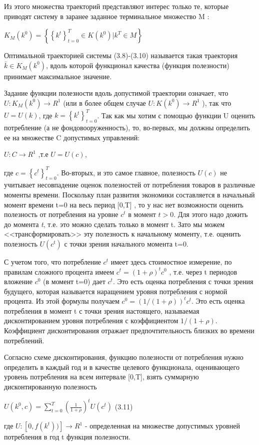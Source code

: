 \documentclass[12pt, 4paper]{book}
\begin{document}
{Из этого множества траекторий представляют интерес только те, которые приводят систему в заранее заданное терминальное множество M :
\begin{center}
$K_M(k^0)=\left\{\left\{k^t\right\}_{t=0}^T \in K(k^0)|k^T \in M\right\}$
\end{center}
\par

Оптимальной траекторией системы (3.8)-(3.10) называется такая траектория $\bar{k} \in K_M(k^0)$, вдоль которой функционал качества (функция полезности) принимает максимальное значение.
\par

Задание функции полезности вдоль допустимой траектории означает, что $U:K_M(k^0) \rightarrow R^1$ (или в более общем случае $U:K(k^0) \rightarrow R^1$ ), так что $U=U(k)$, где $k=\left\{k^t\right\}_{t=0}^T$. Так как мы хотим с помощью функции U оценить потребление (а не фондовооруженность), то, во-первых, мы должны определить ее на множестве C допустимых управлений:
\begin{center}
$U:C \rightarrow R^1$ ,т.е $U=U(c)$,
\end{center}
где  $c=\left\{c^t\right\}_{t=0}^T$. Во-вторых, и это самое главное, полезность $U(c)$ не учитывает несовпадение оценок полезностей от потребления товаров в различные моменты времени. Поскольку план развития экономики составляется в начальный момент времени t=0 на весь период [0,T] , то у нас нет возможности оценить полезность от потребления на уровне $c^t$ в момент $t>0$. Для этого надо дожить до момента \textit{t}, т.е. это можно сделать только в момент t. Зато мы можем <<трансформировать>> эту полезность к начальному моменту, т.е. оценить полезность $U(c^t)$ с точки зрения начального момента t=0.
\par

С учетом того, что потребление $c^t$ имеет здесь стоимостное измерение, по правилам сложного процента имеем $c^t = (1 + \rho)^t c^0$ , т.е. через t периодов вложение $c^0$ (в момент t=0) дает $c^t$. Это есть оценка потребления с точки зрения будущего, которая называется наращением уровня потребления с нормой процента. Из этой формулы получаем $c^0=(1/(1+\rho))^t c^t$. Это есть оценка потребления в момент t с точки зрения настоящего, называемая дисконтированием уровня потребления с коэффициентом $1/(1+\rho)$. Коэффициент дисконтирования отражает предпочтительность близких во времени потреблений.
\par

Согласно схеме дисконтирования, функцию полезности от потребления нужно определить в каждый год и в качестве целевого функционала, оценивающего уровень потребления на всем интервале [0,T], взять суммарную дисконтированную полезность
\begin{center}
$U(k^0,c)=\sum\limits_{t=0}^{T}(\frac{1}{1 + \rho})^t U(c^t)$ (3.11)
\end{center}
где $U:[0,f(k^t))] \rightarrow R^1$ - определенная на множестве допустимых уровней потребления в год t функция полезности.
\par

}
\end{document}
